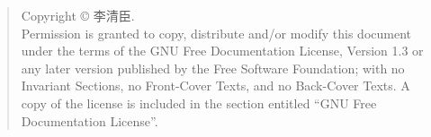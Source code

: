 \newpage\thispagestyle{empty}
\begin{quote}\footnotesize
    Copyright \copyright{} {\the\year} 李清臣. \\
    Permission is granted to copy, distribute and/or modify this document
    under the terms of the GNU Free Documentation License, Version 1.3
    or any later version published by the Free Software Foundation;
    with no Invariant Sections, no Front-Cover Texts, and no Back-Cover Texts.
    A copy of the license is included in the section entitled ``GNU
    Free Documentation License''.
\end{quote}


\endinput

